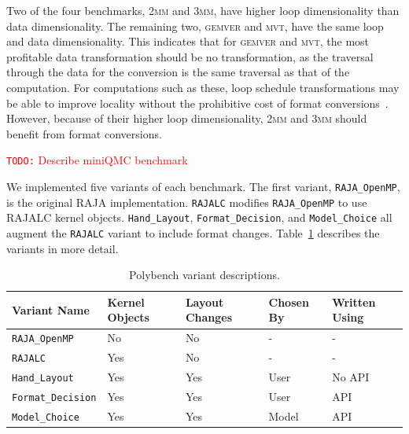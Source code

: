 \documentclass[sigconf,review=true]{acmart}
\newcommand{\todo}[1]{{\textcolor{red}{{\tt{TODO:}}\,\,#1 }}}
\begin{document}
Two of the four benchmarks, \textsc{2mm} and \textsc{3mm}, have higher loop dimensionality than data dimensionality. 
The remaining two, \textsc{gemver} and \textsc{mvt}, have the same loop and data dimensionality. 
This indicates that for \textsc{gemver} and \textsc{mvt}, the most profitable data transformation should be no transformation, as the traversal through the data for the conversion is the same traversal as that of the computation.
For computations such as these, loop schedule transformations may be able to improve locality without the prohibitive cost of format conversions~\cite{kandemir1998improving}.
However, because of their higher loop dimensionality, \textsc{2mm} and \textsc{3mm} should benefit from format conversions.

\todo{Describe miniQMC benchmark}

We implemented five variants of each benchmark.
The first variant, \verb.RAJA_OpenMP., is the original RAJA implementation.
\verb.RAJALC. modifies \verb.RAJA_OpenMP. to use RAJALC kernel objects.
\verb.Hand_Layout., \verb.Format_Decision., and \verb.Model_Choice. all augment the \verb.RAJALC. variant to include format changes.
Table~\ref{VariantDescription} describes the variants in more detail.

\begin{table}
	\centering
	\begin{tabular}{ p{2.4cm} | p{1.1cm} | p{1.1cm} | p{1cm} | p{1cm}}
		 \raggedright Variant \linebreak Name & \raggedright Kernel Objects & \raggedright Layout Changes & \raggedright Chosen By &  Written Using \tabularnewline
		\hline
		\verb.RAJA_OpenMP. & No & No & - & - \\
		\verb.RAJALC. & Yes & No & - & - \\
		\verb.Hand_Layout. & Yes & Yes & User & No API \\
		\verb.Format_Decision. & Yes & Yes & User & API \\
		\verb.Model_Choice. & Yes & Yes & Model & API
	\end{tabular}
	\caption{Polybench variant descriptions.}
	\label{VariantDescription}
\end{table}
\end{document}
